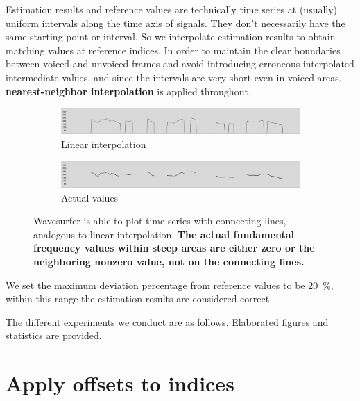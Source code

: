 \documentclass[11pt,a4paper]{report}
\begin{document}
Estimation results and reference values are technically time series at (usually) uniform intervals along the time axis of signals.
They don't necessarily have the same starting point or interval.
So we interpolate estimation results to obtain matching values at reference indices.
In order to maintain the clear boundaries between voiced and unvoiced frames and avoid introducing erroneous interpolated intermediate values, and since the intervals are very short even in voiced areas, \textbf{nearest-neighbor interpolation} is applied throughout.

\begin{figure}[htbp]
  \centering
  \begin{subfigure}{\textwidth}
    \includegraphics[width=\textwidth]{f0s-lp.png}
    \caption{Linear interpolation}
    \label{fig:f0s-lp}
  \end{subfigure}

  \begin{subfigure}{\textwidth}
    \includegraphics[width=\textwidth]{f0s-real.png}
    \caption{Actual values}
    \label{fig:f0s-real}
  \end{subfigure}

  \caption[Data plotting options in Wavesurfer.]{Wavesurfer is able to plot time series with connecting lines, analogous to linear interpolation.
    \textbf{The actual fundamental frequency values within steep areas are either zero or the neighboring nonzero value, not on the connecting lines.}}
  \label{fig:f0s}
\end{figure}

We set the maximum deviation percentage from reference values to be \SI{20}{\percent}, within this range the estimation results are considered correct.

The different experiments we conduct are as follows.
Elaborated figures and statistics are provided.

\section{Apply offsets to indices}
\end{document}
